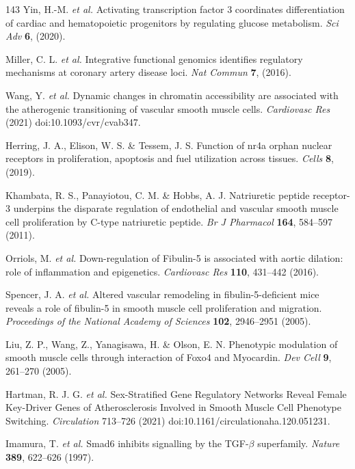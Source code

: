 \documentclass[12pt]{article}
\begin{document}
\begin{thebibliography}{143}
 Yin, H.-M. \textit{et al.} Activating transcription factor 3 coordinates differentiation of cardiac and hematopoietic progenitors by regulating glucose metabolism. \textit{Sci Adv} \textbf{6}, (2020).

 Miller, C. L. \textit{et al.} Integrative functional genomics identifies regulatory mechanisms at coronary artery disease loci. \textit{Nat Commun} \textbf{7}, (2016).

 Wang, Y. \textit{et al.} Dynamic changes in chromatin accessibility are associated with the atherogenic transitioning of vascular smooth muscle cells. \textit{Cardiovasc Res} (2021) doi:10.1093/cvr/cvab347.

 Herring, J. A., Elison, W. S. \& Tessem, J. S. Function of nr4a orphan nuclear receptors in proliferation, apoptosis and fuel utilization across tissues. \textit{Cells} \textbf{8}, (2019).

 Khambata, R. S., Panayiotou, C. M. \& Hobbs, A. J. Natriuretic peptide receptor-3 underpins the disparate regulation of endothelial and vascular smooth muscle cell proliferation by C-type natriuretic peptide. \textit{Br J Pharmacol} \textbf{164}, 584--597 (2011).

 Orriols, M. \textit{et al.} Down-regulation of Fibulin-5 is associated with aortic dilation: role of inflammation and epigenetics. \textit{Cardiovasc Res} \textbf{110}, 431--442 (2016).

 Spencer, J. A. \textit{et al.} Altered vascular remodeling in fibulin-5-deficient mice reveals a role of fibulin-5 in smooth muscle cell proliferation and migration. \textit{Proceedings of the National Academy of Sciences} \textbf{102}, 2946--2951 (2005).

 Liu, Z. P., Wang, Z., Yanagisawa, H. \& Olson, E. N. Phenotypic modulation of smooth muscle cells through interaction of Foxo4 and Myocardin. \textit{Dev Cell} \textbf{9}, 261--270 (2005).

 Hartman, R. J. G. \textit{et al.} Sex-Stratified Gene Regulatory Networks Reveal Female Key-Driver Genes of Atherosclerosis Involved in Smooth Muscle Cell Phenotype Switching. \textit{Circulation} 713--726 (2021) doi:10.1161/circulationaha.120.051231.

 Imamura, T. \textit{et al.} Smad6 inhibits signalling by the TGF-$\beta$ superfamily. \textit{Nature} \textbf{389}, 622--626 (1997).


\end{thebibliography}
\end{document}
